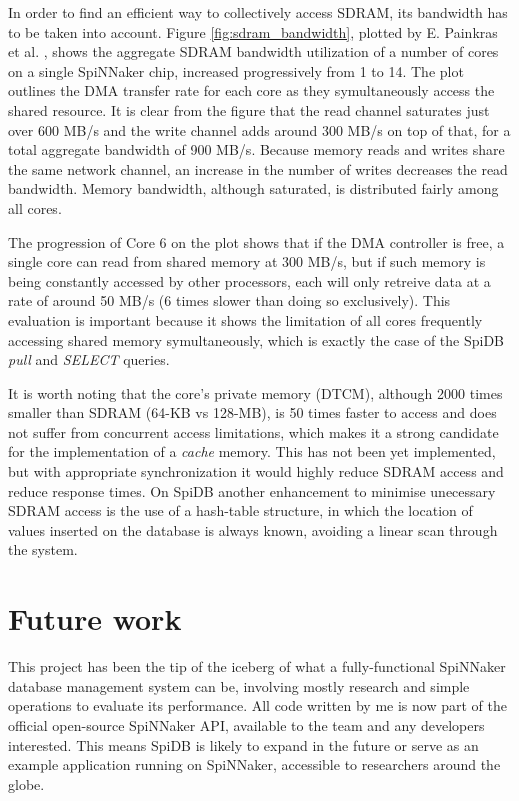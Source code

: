 In order to find an efficient way to collectively access SDRAM, its bandwidth has to be taken into account. Figure \ref{fig:sdram_bandwidth}, plotted by E. Painkras et al. \cite{painkras}, shows the aggregate SDRAM bandwidth utilization of a number of cores on a single SpiNNaker chip, increased progressively from 1 to 14. The plot outlines the DMA transfer rate for each core as they symultaneously access the shared resource. It is clear from the figure that the read channel saturates just over 600 MB/s and the write channel adds around 300 MB/s on top of that, for a total aggregate bandwidth of 900 MB/s. Because memory reads and writes share the same network channel, an increase in the number of writes decreases the read bandwidth. Memory bandwidth, although saturated, is distributed fairly among all cores. \cite{painkras}

The progression of Core 6 on the plot shows that if the DMA controller is free, a single core can read from shared memory at 300 MB/s, but if such memory is being constantly accessed by other processors, each will only retreive data at a rate of around 50 MB/s (6 times slower than doing so exclusively). This evaluation is important because it shows the limitation of all cores frequently accessing shared memory symultaneously, which is exactly the case of the SpiDB \textit{pull} and \textit{SELECT} queries.

It is worth noting that the core's private memory (DTCM), although 2000 times smaller than SDRAM (64-KB vs 128-MB), is 50 times faster to access and does not suffer from concurrent access limitations, which makes it a strong candidate for the implementation of a \textit{cache} memory. This has not been yet implemented, but with appropriate synchronization it would highly reduce SDRAM access and reduce response times. On SpiDB another enhancement to minimise unecessary SDRAM access is the use of a hash-table structure, in which the location of values inserted on the database is always known, avoiding a linear scan through the system.

\section{Future work}
This project has been the tip of the iceberg of what a fully-functional SpiNNaker database management system can be, involving mostly research and simple operations to evaluate its performance. All code written by me is now part of the official open-source SpiNNaker API, available to the team and any developers interested. This means SpiDB is likely to expand in the future or serve as an example application running on SpiNNaker, accessible to researchers around the globe.

